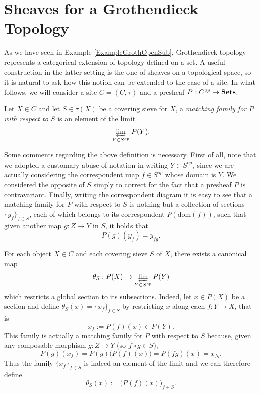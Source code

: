 
\section{Sheaves for a Grothendieck Topology}\label{SheavesGrothTop}
As we have seen in Example \ref{ExampleGrothOpenSub}, Grothendieck topology represents a categorical extension of topology defined on a set. A useful construction in the latter setting is the one of sheaves on a topological space, so it is natural to ask how this notion can be extended to the case of a site. In what follows, we will consider a site $C=(C,\tau)$ and a presheaf $P:C^{op}\to {\normalfont\textbf{Sets}}$. 
\begin{defi}
	Let $X\in C$ and let $S\in \tau(X)$ be a covering sieve for $X$, a \textit{matching family for $P$ with respect to $S$} \underline{is an element} of the limit
	\begin{equation*}
		\varprojlim_{Y\in S^{op}}P(Y).
	\end{equation*}
\end{defi}
\begin{rem}
	Some comments regarding the above definition is necessary. First of all, note that we adopted a customary abuse of notation in writing $Y\in S^{op}$, since we are actually considering the correspondent map $f\in S^{op}$ whose domain is $Y$. We considered the opposite of $S$ simply to correct for the fact that a presheaf $P$ is contravariant. Finally, writing the correspondent diagram it is easy to see that a matching family for $P$ with respect to $S$ is nothing but a collection of sections $\{y_f\}_{f\in S}$, each of which belongs to its correspondent $P(\mbox{dom}(f))$,  such that given another map $g:Z\to Y$ in $S$, it holds that
	\begin{equation*}
		P(g)(y_f)=y_{fg}.
	\end{equation*}
\end{rem}

For each object $X\in C$ and each covering sieve $S$ of $X$, there exists a canonical map 
\begin{equation}\label{canonicalMapSheaf}
	\theta_S:P(X)\to \varprojlim_{Y\in S^{op}}P(Y)	
\end{equation}
which restricts a global section to its subsections. Indeed, let $x\in P(X)$ be a section and define $\theta_S(x)=\{x_f\}_{f\in S}$ by restricting $x$ along each $f:Y\to X$, that is 
\begin{equation*}
	x_f:=P(f)(x)\in P(Y).
\end{equation*} 
This family is actually a matching family for $P$ with respect to $S$ because, given any composable morphism \( g : Z \to Y \) (so \( f \circ g \in S \)),
\[
P(g)(x_f)
= P(g)\big(P(f)(x)\big)
= P(f  g)(x)
= x_{f g}.
\]
Thus the family \( \{x_f\}_{f \in S} \) is indeed an element of the limit and we can therefore define
\[
\theta_S(x) := \big( P(f)(x) \big)_{f \in S}.
\]

